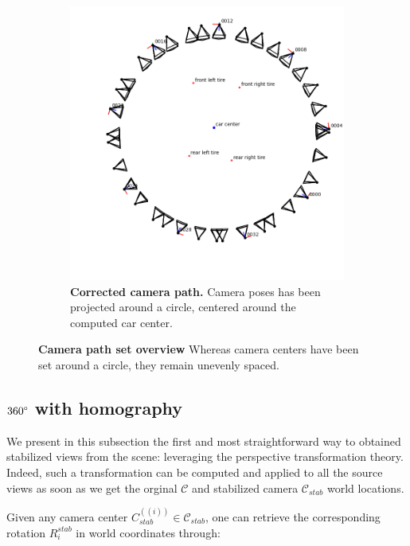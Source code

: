 \begin{figure}[htb!]
\begin{subfigure}[b]{0.45\linewidth}
    \includegraphics[width=\linewidth]{images/gaussiansplatting/camera-path-stabilized.png}
    \caption{\textbf{Corrected camera path.} Camera poses has been projected around a circle, centered around the computed car center.}
    \label{fig:gs-camera-path-stab}
  \end{subfigure}
  \caption{\textbf{Camera path set overview} Whereas camera centers have been set around a circle, they remain unevenly spaced.}
  \label{fig:gs-campath}
\end{figure}

\subsection{$360\degree$ with homography}

We present in this subsection the first and most straightforward way to obtained stabilized views from the scene: leveraging the perspective transformation theory. Indeed, such a transformation can be computed and applied to all the source views as soon as we get the orginal $\mathcal{C}$ and stabilized camera $\mathcal{C}_{stab}$ world locations. 

Given any camera center $C^{((i))}_{stab} \in \mathcal{C}_{stab}$, one can retrieve the corresponding rotation $R_{i}^{stab}$ in world coordinates through: 

